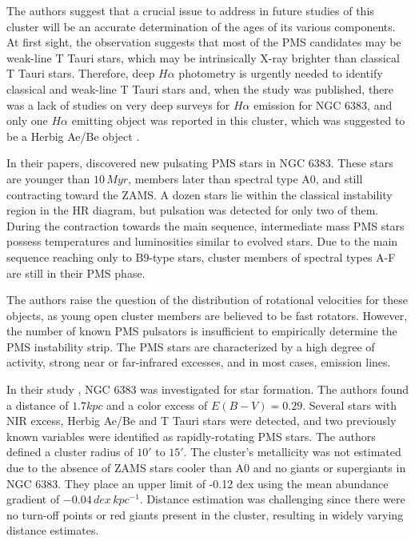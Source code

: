 \documentclass[fleqn,usenatbib,usedcolumn,useAMS]{mnras}
\begin{document}
The authors suggest that a crucial issue to address in future studies of this cluster will be an accurate determination of the ages of its various components. At first sight, the observation suggests that most of the PMS candidates may be weak-line T Tauri stars, which may be intrinsically X-ray brighter than classical T Tauri stars. Therefore, deep $H\alpha$ photometry is urgently needed to identify classical and weak-line T Tauri stars and, when the study was published, there was a lack of studies on very deep surveys for $H\alpha$ emission for NGC 6383, and only one $H\alpha$ emitting object was reported in this cluster, which was suggested to be a Herbig Ae/Be object \citep{2003A&A...407..925R}.

In their papers, \citet{zwintz_marconi_kallinger_weiss_2004,2005MNRAS.357..345Z} discovered new pulsating PMS stars in NGC 6383. These stars are younger than $10\,Myr$, members later than spectral type A0, and still contracting toward the ZAMS. A dozen stars lie within the classical instability region in the HR diagram, but pulsation was detected for only two of them. During the contraction towards the main sequence, intermediate mass PMS stars possess temperatures and luminosities similar to evolved stars. Due to the main sequence reaching only to B9-type stars, cluster members of spectral types A-F are still in their PMS phase.

The authors raise the question of the distribution of rotational velocities for these objects, as young open cluster members are believed to be fast rotators. However, the number of known PMS pulsators is insufficient to empirically determine the PMS instability strip. The PMS stars are characterized by a high degree of activity, strong near or far-infrared excesses, and in most cases, emission lines.

In their study \citet{2007A&A...462..157P}, NGC 6383 was investigated for star formation. The authors found a distance of $1.7 kpc$ and a color excess of $E(B-V) = 0.29$. Several stars with NIR excess, Herbig Ae/Be and T Tauri stars were detected, and two previously known variables were identified as rapidly-rotating PMS stars. The authors defined a cluster radius of $10'$ to $15'$. The cluster's metallicity was not estimated due to the absence of ZAMS stars cooler than A0 and no giants or supergiants in NGC 6383. They place an upper limit of -0.12 dex using the mean abundance gradient of $-0.04\,dex\, kpc^{-1}$. Distance estimation was challenging since there were no turn-off points or red giants present in the cluster, resulting in widely varying distance estimates.
\end{document}
